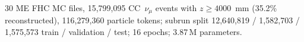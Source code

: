 30 ME FHC MC files, 15{,}799{,}095 CC~$\nu_\mu$ events with $z \ge 4000$~mm (35.2\% reconstructed), 116{,}279{,}360 particle tokens; subrun split 12{,}640{,}819 / 1{,}582{,}703 / 1{,}575{,}573 train / validation / test; 16 epochs; 3.87\,M parameters.

